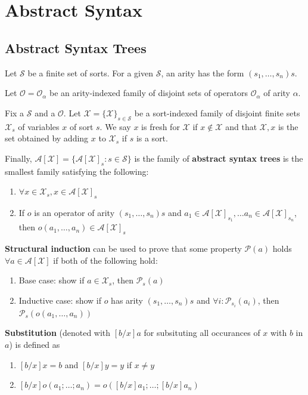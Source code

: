 \documentclass[11pt]{book}
\begin{document}
\chapter{Abstract Syntax}
\section{Abstract Syntax Trees}

Let $\mathcal{S}$ be a finite set of sorts. For a given $\mathcal{S}$, an arity has the form $(s_1,\dots,s_n)s$. 

Let $\mathcal{O} = {\mathcal{O}_\alpha}$ be an arity-indexed family of disjoint sets of operators ${\mathcal{O}
_\alpha}$ of arity $\alpha$.

Fix a $\mathcal{S}$ and a $\mathcal{O}$. Let $\mathcal{X} = \{\mathcal{X}\}_{s \in \mathcal{S}}$ be a sort-indexed family of disjoint finite sets $\mathcal{X}_s$ of variables $x$ of sort $s$. We say $x$ is fresh for $\mathcal{X}$ if $x \notin \mathcal{X}$ and that $\mathcal{X},x$ is the set obtained by adding $x$ to $\mathcal{X}_s$ if $s$ is a sort.

Finally, $\mathcal{A[X]} = \{{\mathcal{A[X]}}_s : s \in \mathcal{S}\}$ is the family of \textbf{abstract syntax trees} is the smallest family satisfying the following:
\begin{enumerate}
    \item $\forall x \in \mathcal{X}_s, x \in \mathcal{A[X]}_s$
    \item If $o$ is an operator of arity $(s_1,\dots,s_n)s$ and $a_1 \in \mathcal{A[X]}_{s_1}, \dots a_n \in \mathcal{A[X]}_{s_n}$, then $o(a_1,\dots,a_n) \in \mathcal{A[X]}_s$
\end{enumerate}

\br

\textbf{Structural induction} can be used to prove that some property $\mathcal{P}(a)$ holds $\forall a \in \mathcal{A[X]}$ if both of the following hold:
\begin{enumerate}
    \item Base case: show if $a \in \mathcal{X}_s$, then $\mathcal{P}_s(a)$
    \item Inductive case: show if $o$ has arity $(s_1,\dots,s_n)s$ and $\forall i: \mathcal{P}_{s_i}(a_i)$, then $\mathcal{P}_s(o(a_1,\dots,a_n))$
\end{enumerate}

\br

\textbf{Substitution} (denoted with $[b/x]a$ for subsituting all occurances of $x$ with $b$ in $a$) is defined as
\begin{enumerate}
    \item $[b/x]x = b$ and $[b/x]y = y$ if $x \neq y$
    \item $[b/x]o(a_1;\dots;a_n) = o([b/x]a_1;\dots;[b/x]a_n)$
\end{enumerate}
\end{document}
